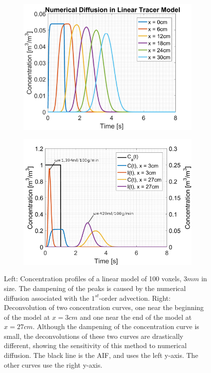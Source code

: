 \documentclass[11pt,english,a4paper,twoside,openright]{report}
\begin{document}
{{{{{{{\begin{figure}[h]
	\centering
	\begin{subfigure}[b]{0.49\textwidth}
		\includegraphics[width=\textwidth]{Chapter4/Chapter4_LinearTracerMethod}
	\end{subfigure}
	\begin{subfigure}[b]{0.49\textwidth}
		\includegraphics[width=\textwidth]{Chapter4/Chapter4_LinearTracerMethod_Deconvolution}
	\end{subfigure}
	\caption[Depiction of the numerical diffusion present in the continuous tracer method with a linear model]{Left: Concentration profiles of a linear model of 100 voxels, $3mm$ in size. The dampening of the peaks is caused by the numerical diffusion associated with the $1^{st}$-order advection. Right: Deconvolution of two concentration curves, one near the beginning of the model at $x=3cm$ and one near the end of the model at $x=27cm$. Although the dampening of the concentration curve is small, the deconvolutions of these two curves are drastically different, showing the sensitivity of this method to numerical diffusion. The black line is the AIF, and uses the left y-axis. The other curves use the right y-axis.}
	\label{fig:LinearBrainModel}
\end{figure}

}}}}}}}
\end{document}

